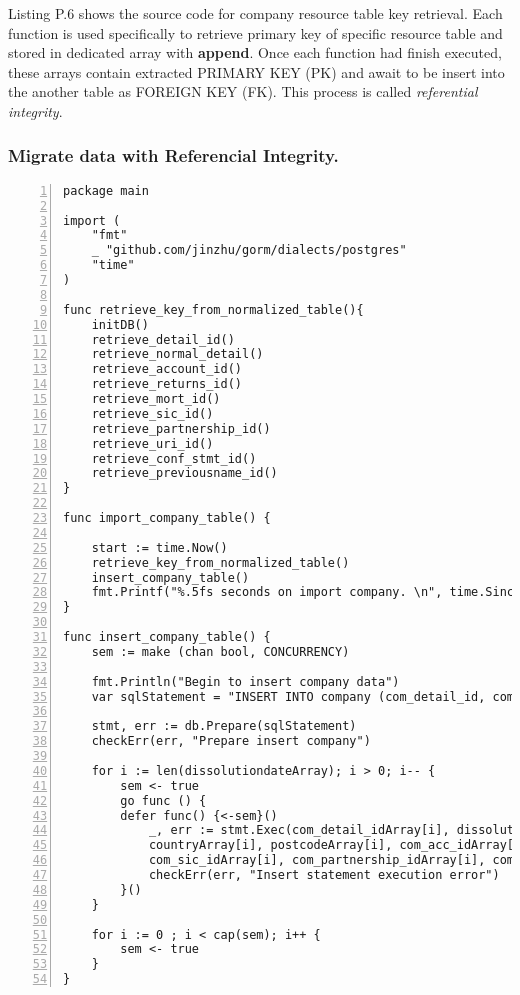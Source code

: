 Listing P.6 shows the source code for company resource table key retrieval. Each function is used specifically to retrieve primary key of specific resource table and stored in dedicated array with \textbf{append}. Once each function had finish executed, these arrays contain extracted PRIMARY KEY (PK) and await to be insert into the another table as FOREIGN KEY (FK). This process is called \textit{referential integrity}.

\subsubsection{Migrate data with Referencial Integrity.}

\lstset{basicstyle=\ttfamily\tiny}  
\begin{lstlisting}[breaklines, frame=single, numbers=left, caption={Resource Table Key Retrieval Function.}, label=commandline-02]
package main 

import (
	"fmt" 
	_ "github.com/jinzhu/gorm/dialects/postgres"
	"time"
)

func retrieve_key_from_normalized_table(){
	initDB()
	retrieve_detail_id()
	retrieve_normal_detail()
	retrieve_account_id()
	retrieve_returns_id()
	retrieve_mort_id()
	retrieve_sic_id()
	retrieve_partnership_id()
	retrieve_uri_id()
	retrieve_conf_stmt_id()
	retrieve_previousname_id()
}

func import_company_table() { 

	start := time.Now()
	retrieve_key_from_normalized_table()
	insert_company_table()
	fmt.Printf("%.5fs seconds on import company. \n", time.Since(start).Seconds())
}

func insert_company_table() { 
	sem := make (chan bool, CONCURRENCY) 
	
	fmt.Println("Begin to insert company data")
	var sqlStatement = "INSERT INTO company (com_detail_id, com_dissolutiondate, com_incorporationdate, com_countryoforigin, com_careof, com_pobox, com_addressline1, com_addressline2, com_posttown, com_county, com_country, com_postcode, com_acc_id, com_return_id, com_mort_id, com_sic_id, com_partnership_id, com_uri_id, com_pn_id, com_conf_stmt_id) VALUES ($1, $2, $3, $4, $5, $6, $7, $8, $9, $10, $11, $12, $13, $14, $15, $16, $17, $18, $19, $20);"
	
	stmt, err := db.Prepare(sqlStatement)
	checkErr(err, "Prepare insert company")
	
	for i := len(dissolutiondateArray); i > 0; i-- { 
		sem <- true
		go func () {
		defer func() {<-sem}() 
			_, err := stmt.Exec(com_detail_idArray[i], dissolutiondateArray[i], incorporatedateArray[i], countryoforiginArray[i], careofArray[i], poboxArray[i], addressline1Array[i], addressline2Array[i], posttownArray[i], countyArray[i], 
			countryArray[i], postcodeArray[i], com_acc_idArray[i], com_return_idArray[i], com_mort_idArray[i],
			com_sic_idArray[i], com_partnership_idArray[i], com_uri_idArray[i], com_previousname_idArray[i], com_conf_stmt_idArray[i])
			checkErr(err, "Insert statement execution error") 
		}()
	} 
	
	for i := 0 ; i < cap(sem); i++ { 
		sem <- true
	} 
}

\end{lstlisting}

